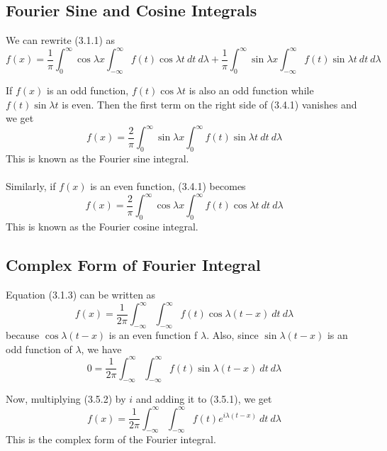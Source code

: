 \documentclass[12pt]{article}
\numberwithin{equation}{subsection}
\begin{document}
\subsection{Fourier Sine and Cosine Integrals}
We can rewrite (3.1.1) as
\begin{equation}
    f(x) = \frac{1}{\pi} \int_{0}^{\infty} { \cos{\lambda x} \int_{-\infty}^{\infty} { f(t) \cos{\lambda t} } \: d{t} } \: d{\lambda} + \frac{1}{\pi} \int_{0}^{\infty} { \sin{\lambda x} \int_{-\infty}^{\infty} { f(t) \sin{\lambda t} } \: d{t} } \: d{\lambda}
\end{equation}

If $f(x)$ is an odd function, $f(t) \cos{\lambda t}$ is also an odd function while $f(t) \sin{\lambda t}$ is even. Then the first term on the right side of (3.4.1) vanishes and we get
\begin{equation}
    \boxed{ f(x) = \frac{2}{\pi} \int_{0}^{\infty} { \sin{\lambda x} \int_{0}^{\infty} { f(t) \sin{\lambda t} } \: d{t} } \: d{\lambda} }
\end{equation}
This is known as the Fourier sine integral.\\~\\

Similarly, if $f(x)$ is an even function, (3.4.1) becomes
\begin{equation}
    \boxed{ f(x) = \frac{2}{\pi} \int_{0}^{\infty} { \cos{\lambda x} \int_{0}^{\infty} { f(t) \cos{\lambda t} } \: d{t} } \: d{\lambda} }
\end{equation}
This is known as the Fourier cosine integral.

\subsection{Complex Form of Fourier Integral}
Equation (3.1.3) can be written as
\begin{equation}
    f(x) = \frac{1}{2\pi} \int_{-\infty}^{\infty} { \int_{-\infty}^{\infty} { f(t) \cos{\lambda(t-x)} } \: d{t} } \: d{\lambda}
\end{equation}
because $\cos{\lambda(t-x)}$ is an even function f $\lambda$. Also, since $\sin{\lambda(t-x)}$ is an odd function of $\lambda$, we have
\begin{equation}
    0 = \frac{1}{2\pi} \int_{-\infty}^{\infty} { \int_{-\infty}^{\infty} { f(t) \sin{\lambda(t-x)} } \: d{t} } \: d{\lambda}
\end{equation}

Now, multiplying (3.5.2) by $i$ and adding it to (3.5.1), we get
\begin{equation}
    \boxed{ f(x) = \frac{1}{2\pi} \int_{-\infty}^{\infty} { \int_{-\infty}^{\infty} { f(t) e^{i\lambda(t-x)} } \: d{t} } \: d{\lambda} }
\end{equation}
This is the complex form of the Fourier integral.
\end{document}
